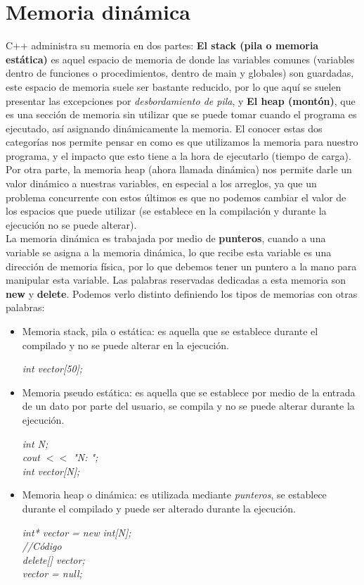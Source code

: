 \section{Memoria dinámica}
C++ administra su memoria en dos partes: \textbf{El stack (pila o memoria estática)} es aquel espacio de memoria de donde las variables comunes (variables dentro de funciones o procedimientos, dentro de main y globales) son guardadas, este espacio de memoria suele ser bastante reducido, por lo que aquí se suelen presentar las excepciones por \textit{desbordamiento de pila}, y \textbf{El heap (montón)}, que es una sección de memoria sin utilizar que se puede tomar cuando el programa es ejecutado, así asignando dinámicamente la memoria. El conocer estas dos categorías nos permite pensar en como es que utilizamos la memoria para nuestro programa, y el impacto que esto tiene a la hora de ejecutarlo (tiempo de carga). Por otra parte, la memoria heap (ahora llamada dinámica) nos permite darle un valor dinámico a nuestras variables, en especial a los arreglos, ya que un problema concurrente con estos últimos es que no podemos cambiar el valor de los espacios que puede utilizar (se establece en la compilación y durante la ejecución no se puede alterar).\\
La memoria dinámica es trabajada por medio de \textbf{punteros}, cuando a una variable se asigna a la memoria dinámica, lo que recibe esta variable es una dirección de memoria física, por lo que debemos tener un puntero a la mano para manipular esta variable. Las palabras reservadas dedicadas a esta memoria son \textbf{new} y \textbf{delete}. Podemos verlo distinto definiendo los tipos de memorias con otras palabras:
\begin{itemize}
    \item Memoria stack, pila o estática: es aquella que se establece durante el compilado y no se puede alterar en la ejecución.\begin{center}\textit{int vector[50];}\end{center}
    \item Memoria pseudo estática: es aquella que se establece por medio de la entrada de un dato por parte del usuario, se compila y no se puede alterar durante la ejecución.
    \begin{center}
        \textit{int N;\\
        cout $<<$ "N: ";\\
        int vector[N];}
    \end{center}
    \item Memoria heap o dinámica: es utilizada mediante \textit{punteros}, se establece durante el compilado y puede ser alterado durante la ejecución.\begin{center}\textit{int* vector = new int[N];\\//Código\\delete[] vector;\\vector = null;}\end{center}
\end{itemize}
